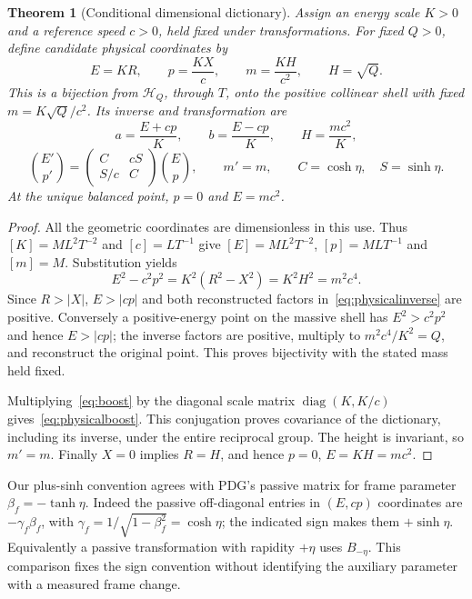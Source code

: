 \documentclass[11pt,a4paper]{article}
\newtheorem{theorem}{Theorem}[section]
\newcommand{\diag}{\operatorname{diag}}
\begin{document}
\begin{theorem}[Conditional dimensional dictionary]
Assign an energy scale $K>0$ and a reference speed $c>0$, held fixed under transformations. For fixed $Q>0$, define candidate physical coordinates by
\begin{equation}
 E=KR,\qquad p=\frac{KX}{c},\qquad m=\frac{KH}{c^2},\qquad H=\sqrt Q.
 \label{eq:dictionary}
\end{equation}
This is a bijection from $\mathcal H_Q$, through $T$, onto the positive collinear shell with fixed $m=K\sqrt Q/c^2$. Its inverse and transformation are
\begin{equation}
 a=\frac{E+cp}{K},\qquad b=\frac{E-cp}{K},\qquad H=\frac{mc^2}{K},
 \label{eq:physicalinverse}
\end{equation}
\begin{equation}
 \binom{E'}{p'}=
 \begin{pmatrix}C&cS\\S/c&C\end{pmatrix}\binom Ep,
 \qquad m'=m,\qquad C=\cosh\eta,\quad S=\sinh\eta.
 \label{eq:physicalboost}
\end{equation}
At the unique balanced point, $p=0$ and $E=mc^2$.
\end{theorem}
\begin{proof}
All the geometric coordinates are dimensionless in this use. Thus $[K]=ML^2T^{-2}$ and $[c]=LT^{-1}$ give $[E]=ML^2T^{-2}$, $[p]=MLT^{-1}$ and $[m]=M$. Substitution yields
\[
 E^2-c^2p^2=K^2(R^2-X^2)=K^2H^2=m^2c^4.
\]
Since $R>|X|$, $E>|cp|$ and both reconstructed factors in~\eqref{eq:physicalinverse} are positive. Conversely a positive-energy point on the massive shell has $E^2>c^2p^2$ and hence $E>|cp|$; the inverse factors are positive, multiply to $m^2c^4/K^2=Q$, and reconstruct the original point. This proves bijectivity with the stated mass held fixed.

Multiplying~\eqref{eq:boost} by the diagonal scale matrix $\diag(K,K/c)$ gives~\eqref{eq:physicalboost}. This conjugation proves covariance of the dictionary, including its inverse, under the entire reciprocal group. The height is invariant, so $m'=m$. Finally $X=0$ implies $R=H$, and hence $p=0$, $E=KH=mc^2$.
\end{proof}

Our plus-sinh convention agrees with PDG's passive matrix for frame parameter $\beta_f=-\tanh\eta$. Indeed the passive off-diagonal entries in $(E,cp)$ coordinates are $-\gamma_f\beta_f$, with $\gamma_f=1/\sqrt{1-\beta_f^2}=\cosh\eta$; the indicated sign makes them $+\sinh\eta$. Equivalently a passive transformation with rapidity $+\eta$ uses $B_{-\eta}$. This comparison fixes the sign convention without identifying the auxiliary parameter with a measured frame change.
\end{document}
